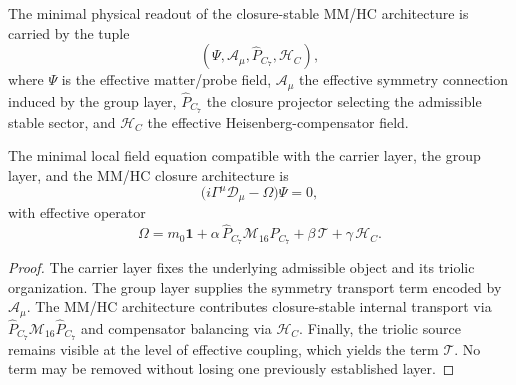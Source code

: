 \begin{definition}
The minimal physical readout of the closure-stable MM/HC architecture is
carried by the tuple
\[
(\Psi,\mathcal A_\mu,\hat P_{C_7},\mathcal H_C),
\]
where $\Psi$ is the effective matter/probe field, $\mathcal A_\mu$ the
effective symmetry connection induced by the group layer,
$\hat P_{C_7}$ the closure projector selecting the admissible stable sector,
and $\mathcal H_C$ the effective Heisenberg-compensator field.
\end{definition}

\begin{theorem}
\label{thm:minimal-mmhc-field-equation}
The minimal local field equation compatible with the carrier layer, the group
layer, and the MM/HC closure architecture is
\[
\bigl(i\Gamma^\mu\mathcal D_\mu-\Omega\bigr)\Psi=0,
\]
with effective operator
\[
\Omega
=
m_0\mathbf 1
+\alpha\,\hat P_{C_7}\mathcal M_{16}\hat P_{C_7}
+\beta\,\mathcal T
+\gamma\,\mathcal H_C.
\]
\end{theorem}

\begin{proof}
The carrier layer fixes the underlying admissible object and its triolic
organization. The group layer supplies the symmetry transport term encoded by
$\mathcal A_\mu$. The MM/HC architecture contributes closure-stable internal
transport via $\hat P_{C_7}\mathcal M_{16}\hat P_{C_7}$ and compensator
balancing via $\mathcal H_C$. Finally, the triolic source remains visible at
the level of effective coupling, which yields the term $\mathcal T$. No term
may be removed without losing one previously established layer.
\end{proof}

